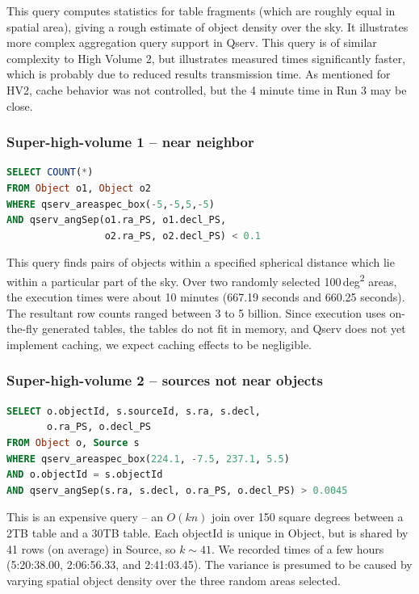 \documentclass[DM,toc]{lsstdoc}
\begin{document}
This query computes statistics for table fragments (which are roughly
equal in spatial area), giving a rough estimate of object density over
the sky. It illustrates more complex aggregation query support in Qserv.
This query is of similar complexity to High Volume 2, but
 illustrates measured times
significantly faster, which is probably due to reduced results
transmission time. As mentioned for HV2, cache behavior was not
controlled, but the 4 minute time in Run 3 may be close.

\subsubsection{Super-high-volume 1 -- near
neighbor}\label{super-high-volume-1-near-neighbor}

\begin{lstlisting}[language=SQL]
SELECT COUNT(*)
FROM Object o1, Object o2
WHERE qserv_areaspec_box(-5,-5,5,-5)
AND qserv_angSep(o1.ra_PS, o1.decl_PS,
                 o2.ra_PS, o2.decl_PS) < 0.1
\end{lstlisting}

This query finds pairs of objects within a specified spherical distance
which lie within a particular part of the sky. Over two randomly
selected 100\,deg\textsuperscript{2} areas, the execution times were
about 10 minutes (667.19 seconds and 660.25 seconds). The resultant row
counts ranged between 3 to 5 billion. Since execution uses on-the-fly
generated tables, the tables do not fit in memory, and Qserv does not
yet implement caching, we expect caching effects to be negligible.

\subsubsection{Super-high-volume 2 -- sources not near
objects}\label{super-high-volume-2-sources-not-near-objects}

\begin{lstlisting}[language=SQL]
SELECT o.objectId, s.sourceId, s.ra, s.decl,
       o.ra_PS, o.decl_PS
FROM Object o, Source s
WHERE qserv_areaspec_box(224.1, -7.5, 237.1, 5.5)
AND o.objectId = s.objectId
AND qserv_angSep(s.ra, s.decl, o.ra_PS, o.decl_PS) > 0.0045
\end{lstlisting}

This is an expensive query -- an \(O(kn)\) join over 150 square degrees
between a 2TB table and a 30TB table. Each objectId is unique in Object,
but is shared by 41 rows (on average) in Source, so \(k
\sim 41\). We recorded times of a few hours (5:20:38.00, 2:06:56.33, and
2:41:03.45). The variance is presumed to be caused by varying spatial
object density over the three random areas selected.
\end{document}
